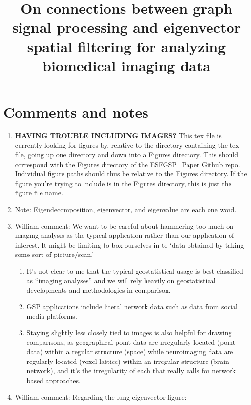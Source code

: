\documentclass[12pt]{article}
\begin{document}
\title{On connections between graph signal processing and eigenvector spatial filtering for analyzing biomedical imaging data}
\date{}
\maketitle

\section*{Comments and notes}

\begin{enumerate}[$\bullet$]
	\item \textbf{HAVING TROUBLE INCLUDING IMAGES?} This tex file is currently looking for figures by, relative to the directory containing the tex file, going up one directory and down into a Figures directory. This should correspond with the Figures directory of the ESFGSP\_Paper Github repo. Individual figure paths should thus be relative to the Figures directory. If the figure you're trying to include is in the Figures directory, this is just the figure file name.
	\item Note: Eigendecomposition, eigenvector, and eigenvalue are each one word.
	\item William comment: We want to be careful about hammering too much on imaging analysis as the typical application rather than our application of interest. It might be limiting to box ourselves in to `data obtained by taking some sort of picture/scan.'
	\begin{enumerate}
		\item It's not clear to me that the typical geostatistical usage is best classified as ``imaging analyses'' and we will rely heavily on geostatistical developments and methodologies in comparison. 
		\item GSP applications include literal network data such as data from social media platforms.
		\item Staying slightly less closely tied to images is also helpful for drawing comparisons, as geographical point data are irregularly located (point data) within a regular structure (space) while neuroimaging data are regularly located (voxel lattice) within an irregular structure (brain network), and it's the irregularity of each that really calls for network based approaches. 
	\end{enumerate}
	\item William comment: Regarding the lung eigenvector figure: 
	\begin{enumerate}

\end{enumerate}
\end{enumerate}
\end{document}
